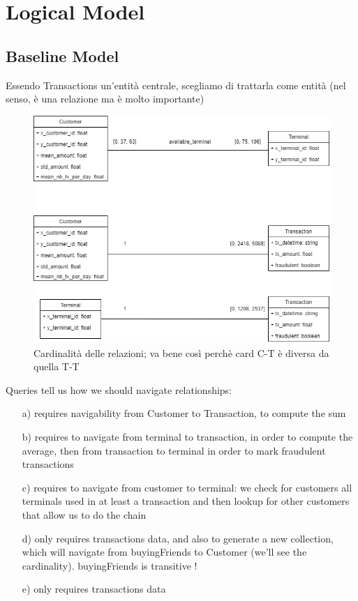 \documentclass[letterpaper,11pt]{article}
\begin{document}
\section{Logical Model}
\subsection{Baseline Model}
Essendo Transactions un'entità centrale, scegliamo di trattarla come entità (nel senso, è una relazione ma è molto importante)\\
\begin{figure}[ht] 
        \centering \includegraphics[width=0.9\columnwidth]{images/MongoCardinality.png}
        \caption{\label{fig1}Cardinalità delle relazioni; va bene così perchè card C-T è diversa da quella T-T}
\end{figure}
Queries tell us how we should navigate relationships:
\begin{enumerate}
    \item[a)] requires navigability from Customer to Transaction, to compute the sum
    \item[b)] requires to navigate from terminal to transaction, in order to compute the average, then from transaction to terminal in order to mark fraudulent transactions
    \item[c)] requires to navigate from customer to terminal: we check for customers all terminals used in at least a transaction and then lookup for other customers that allow us to do the chain
    \item[d)] only requires transactions data, and also to generate a new collection, which will navigate from buyingFriends to Customer (we'll see the cardinality). buyingFriends is transitive !
    \item[e)] only requires transactions data
\end{enumerate}
\end{document}
